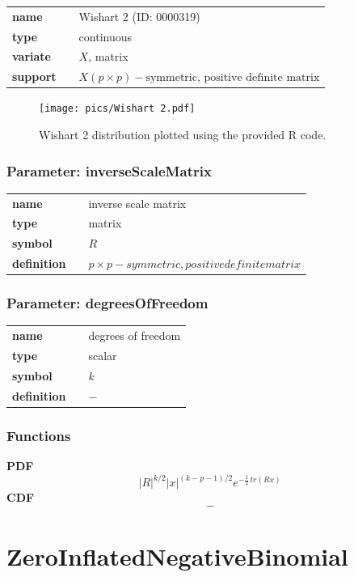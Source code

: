 \documentclass{article}
\begin{document}
\begin{tabular}{p{2cm}cl}
\textbf{name} & & Wishart 2 (ID: 0000319)\\ 
 
\textbf{type} & & continuous \\ 

\textbf{variate} & & $X$, matrix \\ 

\textbf{support} & & $X(p \times p) - \text{symmetric, positive definite matrix}$
\end{tabular}

\begin{figure}[ht!]
\centering
  \texttt{[image: pics/Wishart 2.pdf]}
 \caption{Wishart 2 distribution plotted using the provided R code.}
 \label{fig:Wishart 2}
\end{figure}

\subsubsection*{Parameter: inverseScaleMatrix}

\noindent\begin{tabular}{p{2cm}cl}
\textbf{name} & & inverse scale matrix \\
\textbf{type} & & matrix \\
\textbf{symbol} & & $R$  \\
\textbf{definition} & & $p\times p - symmetric, positive definite matrix$
\end{tabular}
\subsubsection*{Parameter: degreesOfFreedom}

\noindent\begin{tabular}{p{2cm}cl}
\textbf{name} & & degrees of freedom \\
\textbf{type} & & scalar \\
\textbf{symbol} & & $k$  \\
\textbf{definition} & & $-$
\end{tabular}
\subsubsection*{Functions}

\smallskip \noindent \hspace{.2cm} \textbf{PDF} 
\begin{equation*}|R|^{k/2}|x|^{(k-p-1)/2}e^{-\frac{1}2\,tr(Rx)}\end{equation*}
\smallskip \noindent \hspace{.2cm} \textbf{CDF} 
\begin{equation*}-\end{equation*}
\smallskip\section*{ZeroInflatedNegativeBinomial} 
\end{document}
